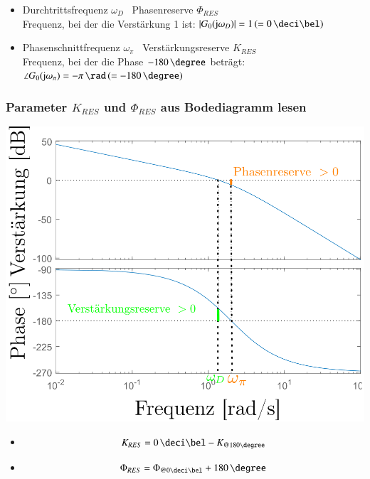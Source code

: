 \begin{itemize}
    \item Durchtrittsfrequenz $\omega_{D}$ \textrightarrow\ Phasenreserve $\Phi_{RES}$ \\
        Frequenz, bei der die Verstärkung 1 ist: $| G_{0}(\jimg \omega_{D})| = 1 \, (= 0 \, \deci \bel)$
    \item Phasenschnittfrequenz $\omega_{\pi}$ \textrightarrow\ Verstärkungsreserve $K_{RES}$ \\
        Frequenz, bei der die Phase $-180 \, \degree$ beträgt: $\angle {G_{0}(\jimg \omega_{\pi})} = - \pi \, \rad \, (= -180 \, \degree)$
\end{itemize}


\subsubsection[Parameter K_{RES} und  \Phi_{RES} aus Bodediagramm lesen]{Parameter $K_{RES}$ und  $\Phi_{RES}$ aus Bodediagramm lesen}

\begin{minipage}[c]{0.55\columnwidth}
    \includegraphics[width=\columnwidth]{images/bodeplot_stabilitaetsreserven.png}
\end{minipage}
\hfill
\begin{minipage}[c]{0.42\columnwidth}
    \begin{itemize}
        \item {}  %
            $$ K_{RES} = 0 \, \deci \bel - K_{\text{@} 180 \degree } $$ 

        \item {} %
            $$ \Phi_{RES} = \Phi_{\text{@}0 \deci \bel }  + 180 \, \degree $$ 
    \end{itemize}
\end{minipage}


